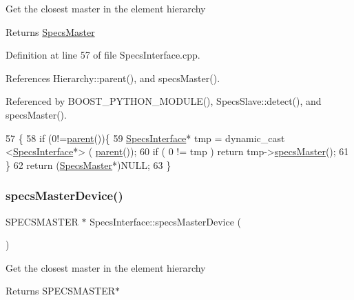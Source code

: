 Get the closest master in the element hierarchy \begin{DoxyReturn}{Returns}
\hyperlink{classSpecsMaster}{Specs\+Master} 
\end{DoxyReturn}


Definition at line 57 of file Specs\+Interface.\+cpp.



References Hierarchy\+::parent(), and specs\+Master().



Referenced by B\+O\+O\+S\+T\+\_\+\+P\+Y\+T\+H\+O\+N\+\_\+\+M\+O\+D\+U\+L\+E(), Specs\+Slave\+::detect(), and specs\+Master().


\begin{DoxyCode}
57                                         \{
58     \textcolor{keywordflow}{if} (0!=\hyperlink{classHierarchy_a1c7bec8257e717f9c1465e06ebf845fc}{parent}())\{
59     \hyperlink{classSpecsInterface}{SpecsInterface}* tmp = dynamic\_cast <\hyperlink{classSpecsInterface}{SpecsInterface}*> (
      \hyperlink{classHierarchy_a1c7bec8257e717f9c1465e06ebf845fc}{parent}());
60     \textcolor{keywordflow}{if} ( 0 != tmp ) \textcolor{keywordflow}{return} tmp->\hyperlink{classSpecsInterface_a3d497c965fb6ec06b49a54b7901a22b2}{specsMaster}();
61   \}
62   \textcolor{keywordflow}{return} (\hyperlink{classSpecsMaster}{SpecsMaster}*)NULL;
63 \}
\end{DoxyCode}
\mbox{\label{classSpecsInterface_aa8aeaa74acf2c913905ea996d153a6ef}} 
\subsubsection{\texorpdfstring{specs\+Master\+Device()}{specsMasterDevice()}}
{\footnotesize\ttfamily S\+P\+E\+C\+S\+M\+A\+S\+T\+ER $\ast$ Specs\+Interface\+::specs\+Master\+Device (\begin{DoxyParamCaption}{ }\end{DoxyParamCaption})\hspace{0.3cm}{\ttfamily [virtual]}}

Get the closest master in the element hierarchy \begin{DoxyReturn}{Returns}
S\+P\+E\+C\+S\+M\+A\+S\+T\+E\+R$\ast$ 
\end{DoxyReturn}


